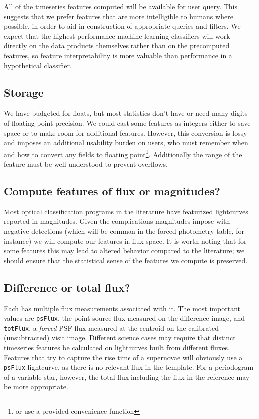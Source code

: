 \documentclass[DM,authoryear,toc]{lsstdoc}
\begin{document}
All of the timeseries features computed will be available for user query.
This suggests that we prefer features that are more intelligible to humans where possible, in order to aid in construction of appropriate queries and filters.
We expect that the highest-performance machine-learning classifiers will work directly on the data products themselves rather than on the precomputed features, so feature interpretability is more valuable than performance in a hypothetical classifier.

\subsection{Storage}

We have budgeted for floats, but most statistics don't have or need many digits of floating point precision.
We could cast some features as integers either to save space or to make room for additional features.
However, this conversion is lossy and imposes an additional usability burden on users, who must remember when and how to convert any fields to floating point\footnote{or use a provided convenience function}.
Additionally the range of the feature must be well-understood to prevent overflows.

\subsection{Compute features of flux or magnitudes?}

Most optical classification programs in the literature have featurized lightcurves reported in magnitudes.
Given the complications magnitudes impose with negative detections (which will be common in the forced photometry table, for instance) we will compute our features in flux space.
It is worth noting that for some features this may lead to altered behavior compared to the literature; we should ensure that the statistical sense of the features we compute is preserved. 

\subsection{Difference or total flux?} \label{sec:totFlux}

Each \DIASource has multiple flux measurements associated with it.  
The most important values are \texttt{psFlux}, the point-source flux measured on the difference image, and \texttt{totFlux}, a \textit{forced} PSF flux measured at the \DIASource centroid on the calibrated (unsubtracted) visit image.
Different science cases may require that distinct timeseries features be calculated on lightcurves built from different fluxes.
Features that try to capture the rise time of a supernovae will obviously use a \texttt{psFlux} lightcurve, as there is no relevant flux in the template.
For a periodogram of a variable star, however, the total flux including the flux in the reference may be more appropriate.
\end{document}
